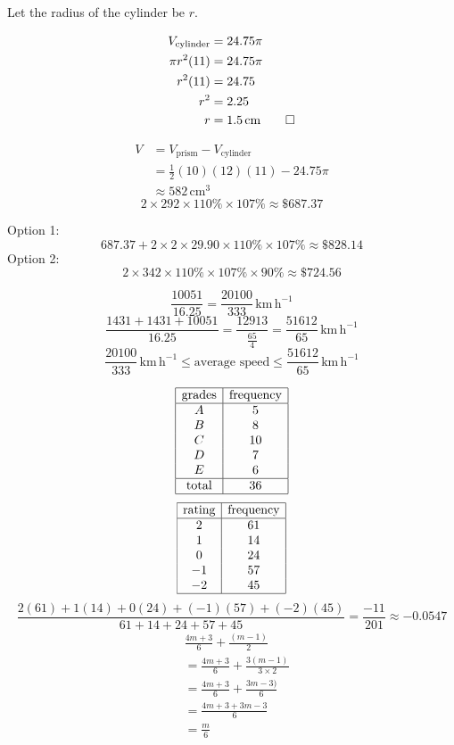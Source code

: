 \documentclass[]{article}
\begin{document}
Let the radius of the cylinder be \(r\).

\[\begin{aligned}
    V_{\text{cylinder}}&=24.75\pi\\
    \pi r^2(11)&=24.75\pi\\
    r^2(11)&=24.75\\
    r^2&=2.25\\
    r&=1.5\,\text{cm}\qed
\end{aligned}\]

\[\begin{aligned}
    V&=V_\text{prism}-V_\text{cylinder}\\
    &=\frac12(10)(12)(11)-24.75\pi\\
    &\approx582\,\text{cm}^3
\end{aligned}\]
\[2\times292\times110\%\times107\%\approx\$687.37\]

Option 1:
\[687.37+2\times2\times29.90\times110\%\times107\%\approx\$828.14\]
Option 2:
\[2\times342\times110\%\times107\%\times90\%\approx\$724.56\]

\[\frac{10051}{16.25}=\frac{20100}{333}\,\text{km}\,\text{h}^{-1}\]
\[\frac{1431+1431+10051}{16.25}=\frac{12913}{\frac{65}{4}}=\frac{51612}{65}\,\text{km}\,\text{h}^{-1}\]
\[\frac{20100}{333}\,\text{km}\,\text{h}^{-1}\leqslant\text{average speed}\leqslant\frac{51612}{65}\,\text{km}\,\text{h}^{-1}\]
\newpage

\[\begin{array}{|c|c|}
    \hline
    \text{grades}&\text{frequency}\\
    \hline
    A&5\\
    B&8\\
    C&10\\
    D&7\\
    E&6\\
    \hline
    \text{total}&36\\
    \hline
\end{array}\]
\[\begin{array}{|c|c|}
    \hline
    \text{rating}&\text{frequency}\\
    \hline
    2&61\\
    1&14\\
    0&24\\
    -1&57\\
    -2&45\\
    \hline
\end{array}\]
\[\frac{2(61)+1(14)+0(24)+(-1)(57)+(-2)(45)}{61+14+24+57+45}=\frac{-11}{201}\approx-0.0547\]
\newpage
\[\begin{aligned}
    &\frac{4m+3}6+\frac{(m-1)}2\\
    &=\frac{4m+3}6+\frac{3(m-1)}{3\times2}\\
    &=\frac{4m+3}6+\frac{3m-3)}{6}\\
    &=\frac{4m+3+3m-3}6\\
    &=\boxed{\frac{m}6}\\
\end{aligned}\]
\end{document}
